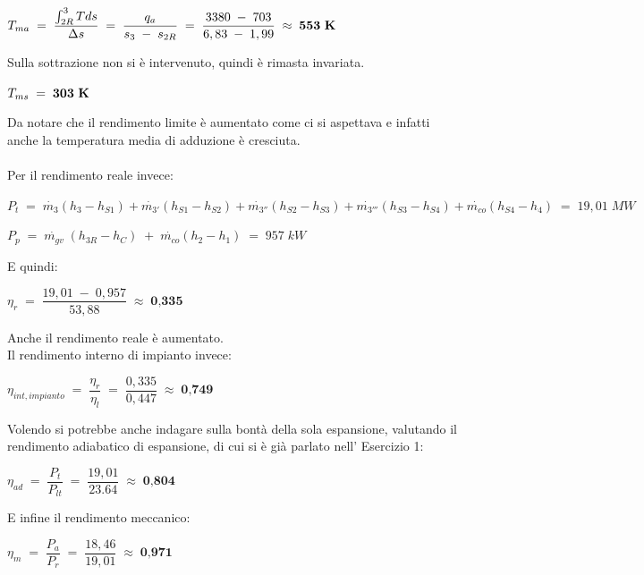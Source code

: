 \documentclass[a4paper, twoside, 12pt]{report}
\begin{document}
\begin{center}
	$T_{ma}\;=\;\dfrac{\int_{2R}^{3}Tds}{\Delta s}\;=\;\dfrac{q_{a}}{s_{3}\;-\;s_{2R}}\;=\;\dfrac{3380\;-\;703}{6,83\;-\;1,99}\;\approx\;\textbf{553\;K}$
\end{center}
Sulla sottrazione non si è intervenuto, quindi è rimasta invariata.
\begin{center}
	$T_{ms}\;=\;\textbf{303\;K}$
\end{center}
Da notare che il rendimento limite è aumentato come ci si aspettava e infatti anche la temperatura media di adduzione è cresciuta.\\
\\Per il rendimento reale invece:
\begin{center}
	$P_{t}\;=\;\dot{m_{3}}(h_{3}-h_{S1})+\dot{m_{3'}}(h_{S1}-h_{S2})+\dot{m_{3''}}(h_{S2}-h_{S3})+\dot{m_{3'''}}(h_{S3}-h_{S4})+\dot{m_{co}}(h_{S4}-h_{4})\;=\;19,01\;MW$
\end{center}
\begin{center}
	$P_{p}\;=\;\dot{m_{gv}}\;(h_{3R}-h_{C})\;+\;\dot{m_{co}}(h_{2}-h_{1})\;=\;957\;kW$
\end{center}
E quindi:
\begin{center}
	$\eta_{r}\;=\;\dfrac{19,01\;-\;0,957}{53,88}\;\approx\;\textbf{0,335}$
\end{center}
Anche il rendimento reale è aumentato.\\
Il rendimento interno di impianto invece:
\begin{center}
	$\eta_{int,impianto}\;=\;\dfrac{\eta_{r}}{\eta_{l}}\;=\;\dfrac{0,335}{0,447}\;\approx\;\textbf{0,749}$
\end{center}
Volendo si potrebbe anche indagare sulla bontà della sola espansione, valutando il rendimento adiabatico di espansione, di cui si è già parlato nell' Esercizio 1:
\begin{center}
	$\eta_{ad}\;=\;\dfrac{P_{t}}{P_{lt}}\;=\;\dfrac{19,01}{23.64}\;\approx\;\textbf{0,804}$
\end{center}
E infine il rendimento meccanico:
\begin{center}
	$\eta_{m}\;=\;\dfrac{P_{a}}{P_{r}}\;=\;\dfrac{18,46}{19,01}\;\approx\;\textbf{0,971}$
\end{center}
\end{document}

